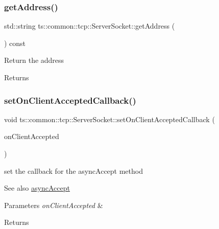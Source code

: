 \subsubsection{\texorpdfstring{get\+Address()}{getAddress()}}
{\footnotesize\ttfamily std\+::string ts\+::common\+::tcp\+::\+Server\+Socket\+::get\+Address (\begin{DoxyParamCaption}{ }\end{DoxyParamCaption}) const\hspace{0.3cm}{\ttfamily [protected]}}

Return the address \begin{DoxyReturn}{Returns}

\end{DoxyReturn}
\mbox{\label{classts_1_1common_1_1tcp_1_1_server_socket_a316d4bd7d6fd81ce9c1158e3619f50e3}} 
\subsubsection{\texorpdfstring{set\+On\+Client\+Accepted\+Callback()}{setOnClientAcceptedCallback()}}
{\footnotesize\ttfamily void ts\+::common\+::tcp\+::\+Server\+Socket\+::set\+On\+Client\+Accepted\+Callback (\begin{DoxyParamCaption}\item[{On\+Client\+Accepted\+Func}]{on\+Client\+Accepted }\end{DoxyParamCaption})}

set the callback for the async\+Accept method \begin{DoxySeeAlso}{See also}
\hyperlink{classts_1_1common_1_1tcp_1_1_server_socket_aab226dbcb314136342551ac145c3fb92}{async\+Accept} 
\end{DoxySeeAlso}

\begin{DoxyParams}{Parameters}
{\em on\+Client\+Accepted} & \\
\hline
\end{DoxyParams}
\begin{DoxyReturn}{Returns}

\end{DoxyReturn}
\mbox{\label{classts_1_1common_1_1tcp_1_1_server_socket_a22005ac2872f0afdecf2d405885f6551}} 
